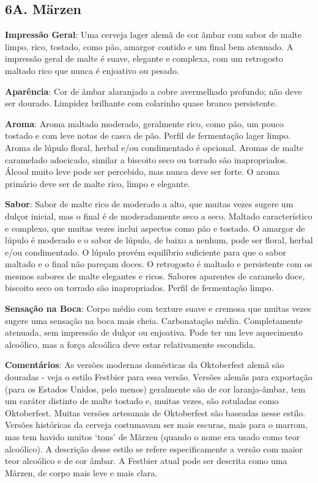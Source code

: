 \subsection*{6A. Märzen}
\textbf{Impressão Geral}: Uma cerveja lager alemã de cor âmbar com sabor de malte limpo, rico, tostado, como pão, amargor contido e um final bem atenuado. A impressão geral de malte é suave, elegante e complexa, com um retrogosto maltado rico que nunca é enjoativo ou pesado.

\textbf{Aparência}: Cor de âmbar alaranjado a cobre avermelhado profundo; não deve ser dourado. Limpidez brilhante com colarinho quase branco persistente.

\textbf{Aroma}: Aroma maltado moderado, geralmente rico, como pão, um pouco tostado e com leve notas de casca de pão. Perfil de fermentação lager limpo. Aroma de lúpulo floral, herbal e/ou condimentado é opcional. Aromas de malte caramelado adocicado, similar a biscoito seco ou torrado são inapropriados. Álcool muito leve pode ser percebido, mas nunca deve ser forte. O aroma primário deve ser de malte rico, limpo e elegante.

\textbf{Sabor}: Sabor de malte rico de moderado a alto, que muitas vezes sugere um dulçor inicial, mas o final é de moderadamente seco a seco. Maltado característico e complexo, que muitas vezes inclui aspectos como pão e tostado. O amargor de lúpulo é moderado e o sabor de lúpulo, de baixo a nenhum, pode ser floral, herbal e/ou condimentado. O lúpulo provém equilíbrio suficiente para que o sabor maltado e o final não pareçam doces. O retrogosto é maltado e persistente com os mesmos sabores de malte elegantes e ricos. Sabores aparentes de caramelo doce, biscoito seco ou torrado são inapropriados. Perfil de fermentação limpo.

\textbf{Sensação na Boca}: Corpo médio com texture suave e cremosa que muitas vezes sugere uma sensação na boca mais cheia. Carbonatação média. Completamente atenuada, sem impressão de dulçor ou enjoativa. Pode ter um leve aquecimento alcoólico, mas a força alcoólica deve estar relativamente escondida.

\textbf{Comentários}: As versões modernas domésticas da Oktoberfest alemã são douradas - veja o estilo Festbier para essa versão. Versões alemãs para exportação (para os Estados Unidos, pelo menos) geralmente são de cor laranja-âmbar, tem um caráter distinto de malte tostado e, muitas vezes, são rotuladas como Oktoberfest. Muitas versões artesanais de Oktoberfest são baseadas nesse estilo. Versões históricas da cerveja costumavam ser mais escuras, mais para o marrom, mas tem havido muitos ‘tons’ de Mãrzen (quando o nome era usado como teor alcoólico). A descrição desse estilo se refere especificamente a versão com maior teor alcoólico e de cor âmbar. A Festbier atual pode ser descrita como uma Märzen, de corpo mais leve e mais clara.

